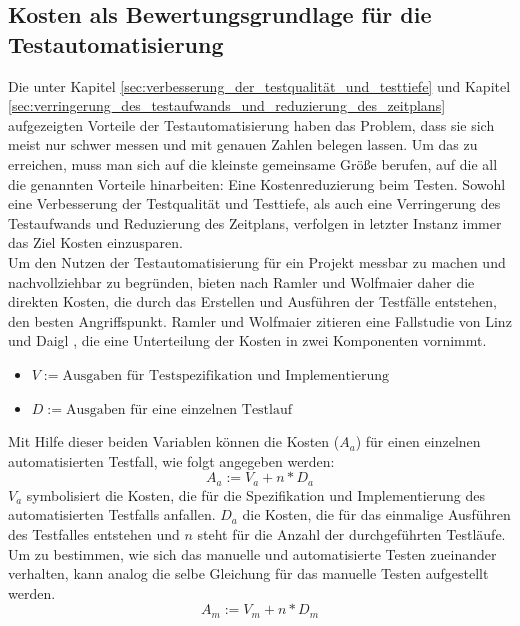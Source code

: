 \subsection{Kosten als Bewertungsgrundlage für die Testautomatisierung}
\label{sec:kosten_der_testautomatisierung}
Die unter Kapitel \ref{sec:verbesserung_der_testqualität_und_testtiefe} und Kapitel \ref{sec:verringerung_des_testaufwands_und_reduzierung_des_zeitplans} aufgezeigten Vorteile der Testautomatisierung haben das Problem, dass sie sich meist nur schwer messen und mit genauen Zahlen belegen lassen.
Um das zu erreichen, muss man sich auf die kleinste gemeinsame Größe berufen, auf die all die genannten Vorteile hinarbeiten: Eine Kostenreduzierung beim Testen.
Sowohl eine Verbesserung der Testqualität und Testtiefe, als auch eine Verringerung des Testaufwands und Reduzierung des Zeitplans, verfolgen in letzter Instanz immer das Ziel Kosten einzusparen.\\
Um den Nutzen der Testautomatisierung für ein Projekt messbar zu machen und nachvollziehbar zu begründen, bieten nach Ramler und Wolfmaier \cite{ramler_economic_2006} daher die direkten Kosten, die durch das Erstellen und Ausführen der Testfälle entstehen, den besten Angriffspunkt. 
Ramler und Wolfmaier \cite{ramler_economic_2006} zitieren eine Fallstudie von Linz und Daigl \cite{dustin_automated_1999}, die eine Unterteilung der Kosten in zwei Komponenten vornimmt.
\begin{itemize}
    \item[] \(V:=\text{Ausgaben für Testspezifikation und Implementierung}\)
    \item[] \(D:=\text{Ausgaben für eine einzelnen Testlauf}\)
\end{itemize}

Mit Hilfe dieser beiden Variablen können die Kosten (\(A_a\)) für einen einzelnen automatisierten Testfall, wie folgt angegeben werden:
\begin{equation}
A_a:=V_a+n*D_a
\end{equation}
\(V_a\) symbolisiert die Kosten, die für die Spezifikation und Implementierung des automatisierten Testfalls anfallen. \(D_a\) die Kosten, die für das einmalige Ausführen des Testfalles entstehen und \(n\) steht für die Anzahl der durchgeführten Testläufe.
Um zu bestimmen, wie sich das manuelle und automatisierte Testen zueinander verhalten, kann analog die selbe Gleichung für das manuelle Testen aufgestellt werden.
\begin{equation}
A_m:=V_m+n*D_m
\end{equation}

